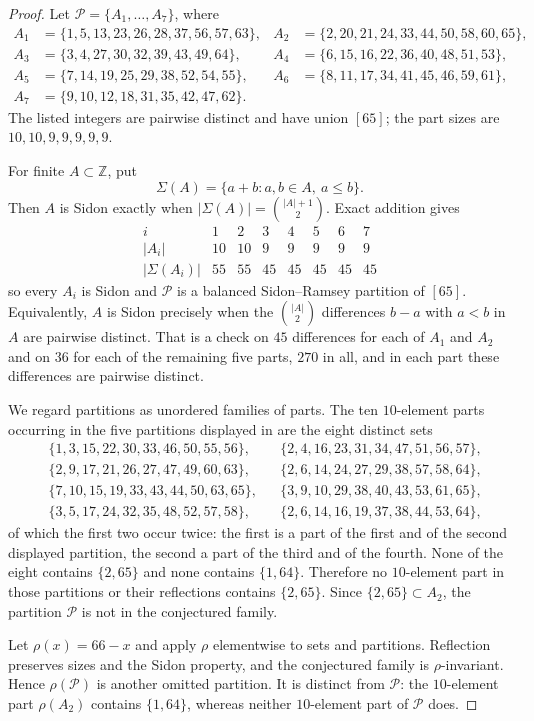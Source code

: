 \documentclass[11pt]{amsart}
\begin{document}
\begin{proof}
Let $\mathcal P=\{A_1,\ldots,A_7\}$, where
\begin{align*}
A_1&=\{1,5,13,23,26,28,37,56,57,63\},&
A_2&=\{2,20,21,24,33,44,50,58,60,65\},\\
A_3&=\{3,4,27,30,32,39,43,49,64\},&
A_4&=\{6,15,16,22,36,40,48,51,53\},\\
A_5&=\{7,14,19,25,29,38,52,54,55\},&
A_6&=\{8,11,17,34,41,45,46,59,61\},\\
A_7&=\{9,10,12,18,31,35,42,47,62\}.&&
\end{align*}
The listed integers are pairwise distinct and have union $[65]$; the
part sizes are $10,10,9,9,9,9,9$.

For finite $A\subset\mathbb Z$, put
\[
  \Sigma(A)=\{a+b:a,b\in A,\ a\le b\}.
\]
Then $A$ is Sidon exactly when
$|\Sigma(A)|=\binom{|A|+1}{2}$. Exact addition gives
\[
\begin{array}{c|ccccccc}
 i&1&2&3&4&5&6&7\\ \hline
 |A_i|&10&10&9&9&9&9&9\\
 |\Sigma(A_i)|&55&55&45&45&45&45&45
\end{array}
\]
so every $A_i$ is Sidon and $\mathcal P$ is a balanced Sidon--Ramsey
partition of $[65]$. Equivalently, $A$ is Sidon precisely when the
$\binom{|A|}{2}$ differences $b-a$ with $a<b$ in $A$ are pairwise
distinct. That is a check on $45$ differences for each of $A_1$ and
$A_2$ and on $36$ for each of the remaining five parts, $270$ in all,
and in each part these differences are pairwise distinct.

We regard partitions as unordered families of parts. The ten
$10$-element parts occurring in the five partitions displayed in
\cite[arXiv v1, p.~6]{EGP} are the eight distinct sets
\begin{align*}
 &\{1,3,15,22,30,33,46,50,55,56\},&
&\{2,4,16,23,31,34,47,51,56,57\},\\
 &\{2,9,17,21,26,27,47,49,60,63\},&
&\{2,6,14,24,27,29,38,57,58,64\},\\
 &\{7,10,15,19,33,43,44,50,63,65\},&
&\{3,9,10,29,38,40,43,53,61,65\},\\
 &\{3,5,17,24,32,35,48,52,57,58\},&
&\{2,6,14,16,19,37,38,44,53,64\},
\end{align*}
of which the first two occur twice: the first is a part of the first and
of the second displayed partition, the second a part of the third and of
the fourth. None of the eight contains $\{2,65\}$ and none contains
$\{1,64\}$. Therefore no $10$-element part in those partitions or their
reflections contains $\{2,65\}$. Since $\{2,65\}\subset A_2$, the
partition $\mathcal P$ is not in the conjectured family.

Let $\rho(x)=66-x$ and apply $\rho$ elementwise to sets and partitions.
Reflection preserves sizes and the Sidon property, and the conjectured
family is $\rho$-invariant. Hence $\rho(\mathcal P)$ is another omitted
partition. It is distinct from $\mathcal P$: the $10$-element part
$\rho(A_2)$ contains $\{1,64\}$, whereas neither $10$-element part of
$\mathcal P$ does.
\end{proof}
\end{document}
